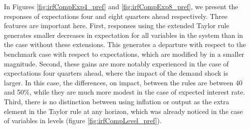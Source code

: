 \documentclass[11pt]{article}
\numberwithin{equation}{section}
\begin{document}
In Figures \ref{fig:irfCompExp4_pref} and \ref{fig:irfCompExp8_pref}, we present the responses of expectations four and eight quarters ahead respectively. Three features are important here. First, responses using the extended Taylor rule generates smaller decreases in expectation for all variables in the system than in the case without these extensions. This generates a departure with respect to the benchmark case with respect to expectations, which are modified by in a smaller magnitude. Second, these gains are more notably experienced in the case of expectations four quarters ahead, where the impact of the demand shock is larger. In this case, the differences, on impact, between the rules are between 40 and 50\%, while they are much more modest in the case of expected interest rate. Third, there is no distinction between using inflation or output as the extra element in the Taylor rule at any horizon, which was already noticed in the case of variables in levels (figure \ref{fig:irfCompLevel_pref}).
\end{document}
